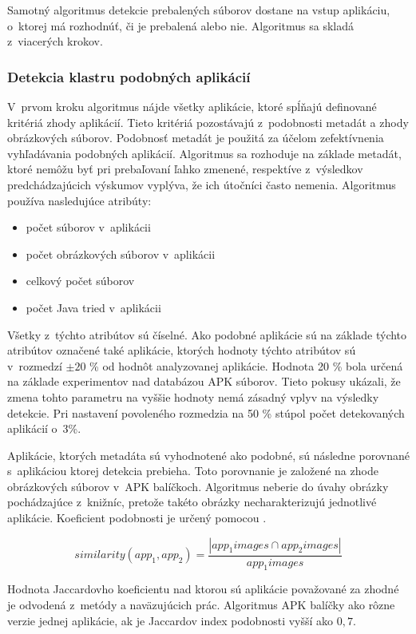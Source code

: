 Samotný algoritmus detekcie prebalených súborov dostane na vstup aplikáciu, o~ktorej má rozhodnúť, či je prebalená alebo nie. Algoritmus sa skladá z~viacerých krokov.

\subsubsection{\textbf{Detekcia klastru podobných aplikácií}} 

V~prvom kroku algoritmus nájde všetky aplikácie, ktoré spĺňajú definované kritériá zhody aplikácií. Tieto kritériá pozostávajú z~podobnosti metadát a zhody obrázkových súborov. 
Podobnosť metadát je použitá za účelom zefektívnenia vyhľadávania podobných aplikácií. Algoritmus sa rozhoduje na základe metadát, ktoré nemôžu byť pri prebaľovaní ľahko zmenené, respektíve z~výsledkov predchádzajúcich výskumov vyplýva, že ich útočníci často nemenia. \newline \noindent Algoritmus používa nasledujúce atribúty:
\begin{itemize}
	\item počet  súborov v~aplikácii
	\item počet obrázkových súborov v~aplikácii
	\item celkový počet súborov
	\item počet Java tried v~aplikácii
\end{itemize}

Všetky z~týchto atribútov sú číselné. Ako podobné aplikácie sú na základe týchto atribútov označené také aplikácie, ktorých hodnoty týchto atribútov sú v~rozmedzí $\pm 20$ \% od hodnôt analyzovanej aplikácie. Hodnota 20 \% bola určená na základe experimentov nad databázou APK súborov. Tieto pokusy ukázali, že zmena tohto parametru na vyššie hodnoty nemá zásadný vplyv na výsledky detekcie. Pri nastavení povoleného rozmedzia na 50 \% stúpol počet detekovaných aplikácií o~3\%.

Aplikácie, ktorých metadáta sú vyhodnotené ako podobné, sú následne porovnané s~aplikáciou ktorej detekcia prebieha. Toto porovnanie je založené na zhode obrázkových súborov v~APK balíčkoch. Algoritmus neberie do úvahy obrázky pochádzajúce z~knižníc, pretože takéto obrázky necharakterizujú jednotlivé aplikácie.  Koeficient podobnosti je určený pomocou .

\[ similarity(app_1, app_2) = \frac{|app_{1}images \cap app_{2}images|} { app_{1}images} \]

Hodnota Jaccardovho koeficientu nad ktorou sú aplikácie považované za zhodné je odvodená z~metódy  a naväzujúcich prác. Algoritmus APK balíčky ako rôzne verzie jednej aplikácie, ak je Jaccardov index podobnosti vyšší ako $0,7$.

